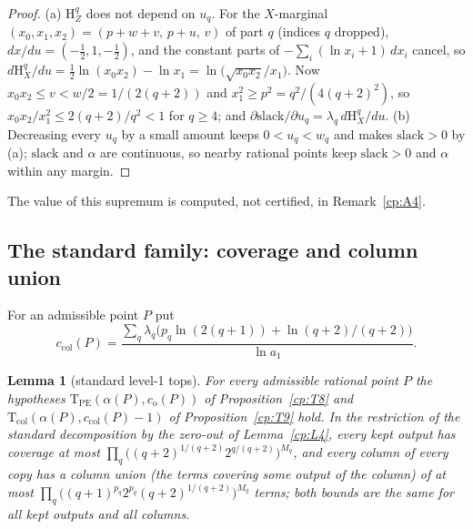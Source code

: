 \documentclass[11pt]{article}
\newtheorem{lemma}[theorem]{Lemma}
\theoremstyle{definition}
\theoremstyle{remark}
\newcommand{\Ent}{\mathrm{H}}                 %
\newcommand{\co}{c_{\mathrm o}}               %
\newcommand{\ccol}{c_{\mathrm{col}}}          %
\newcommand{\TPE}{\mathrm{T}_{\mathrm{PE}}}   %
\newcommand{\Tcol}{\mathrm{T}_{\mathrm{col}}} %
\newcommand{\slack}{\mathrm{slack}}           %
\begin{document}
\begin{proof}
(a) $\Ent^q_Z$ does not depend on $u_q$. For the $X$-marginal $(x_0,x_1,x_2)=(p+w+v,\,p+u,\,v)$ of part $q$ (indices $q$ dropped), $dx/du=(-\frac12,1,-\frac12)$, and the constant parts of $-\sum_i(\ln x_i+1)\,dx_i$ cancel, so $d\Ent^q_X/du=\frac12\ln(x_0x_2)-\ln x_1=\ln\bigl(\sqrt{x_0x_2}/x_1\bigr)$. Now $x_0x_2\le v<w/2=1/(2(q+2))$ and $x_1^2\ge p^2=q^2/(4(q+2)^2)$, so $x_0x_2/x_1^2\le2(q+2)/q^2<1$ for $q\ge4$; and $\partial\slack/\partial u_q=\lambda_q\,d\Ent^q_X/du$.
(b) Decreasing every $u_q$ by a small amount keeps $0<u_q<w_q$ and makes $\slack>0$ by (a); $\slack$ and $\alpha$ are continuous, so nearby rational points keep $\slack>0$ and $\alpha$ within any margin.
\end{proof}

The value of this supremum is computed, not certified, in Remark~\ref{cp:A4}.

\subsection{The standard family: coverage and column union}\label{cp:sec:std}

For an admissible point $P$ put
\[
\ccol(P)=\frac{\sum_q\lambda_q\bigl(p_q\ln(2(q+1))+\ln(q+2)/(q+2)\bigr)}{\ln a_1}.
\]

\begin{lemma}[standard level-1 tops]\label{cp:L10}
For every admissible rational point $P$ the hypotheses $\TPE(\alpha(P),\co(P))$ of Proposition~\ref{cp:T8} and $\Tcol(\alpha(P),\ccol(P)-1)$ of Proposition~\ref{cp:T9} hold. In the restriction of the standard decomposition by the zero-out of Lemma~\ref{cp:L4}, every kept output has coverage at most $\prod_q\bigl((q+2)^{1/(q+2)}2^{q/(q+2)}\bigr)^{M_q}$, and every column of every copy has a column union (the terms covering some output of the column) of at most $\prod_q\bigl((q+1)^{p_q}2^{p_q}(q+2)^{1/(q+2)}\bigr)^{M_q}$ terms; both bounds are the same for all kept outputs and all columns.
\end{lemma}
\end{document}
